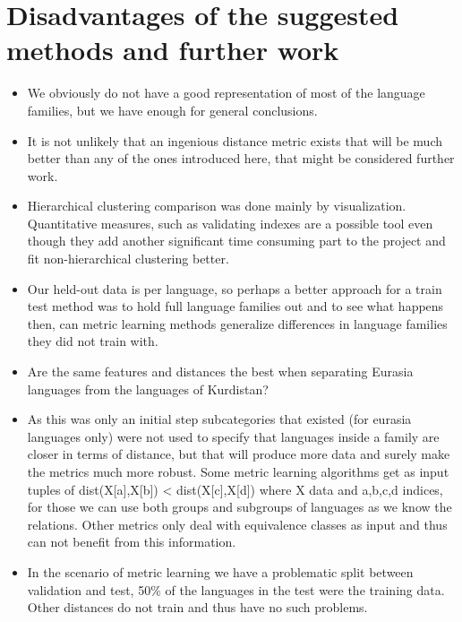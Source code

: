 \documentclass[letterpaper, 11pt]{article}
\begin{document}
\section{Disadvantages of the suggested methods and further work}
\begin{itemize}
	\item We obviously do not have a good representation of most of the language families, but we have enough for general conclusions.
	\item It is not unlikely that an ingenious distance metric exists that will be much better than any of the ones introduced here, that might be considered further work.
	\item Hierarchical clustering comparison was done mainly by visualization. Quantitative measures, such as validating indexes are a possible tool even though they add another significant time consuming part to the project and fit non-hierarchical clustering better.
	\item Our held-out data is per language, so perhaps a better approach for a train test method was to hold full language families out and to see what happens then, can metric learning methods generalize differences in language families they did not train with.
	\item Are the same features and distances the best when separating Eurasia languages from the languages of Kurdistan?
	\item As this was only an initial step subcategories that existed (for eurasia languages only) were not used to specify that languages inside a family are closer in terms of distance, but that will produce more data and  surely make the metrics much more robust. Some metric learning algorithms get as input tuples of dist(X[a],X[b]) < dist(X[c],X[d]) where X data and a,b,c,d indices, for those we can use both groups and subgroups of languages as we know the relations. Other metrics only deal with equivalence classes as input and thus can not benefit from this information.
	\item In the scenario of metric learning we have a problematic split between validation and test, 50\% of the languages in the test were the training data. Other distances do not train and thus have no such problems.
\end{itemize}
\end{document}
